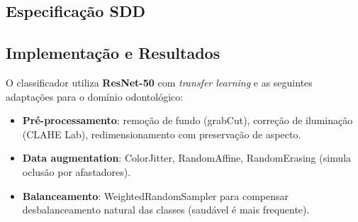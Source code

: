   

\subsection{Especificação SDD}


\subsection{Implementação e Resultados}

O classificador utiliza \textbf{ResNet-50} com \textit{transfer learning}
e as seguintes adaptações para o domínio odontológico:

\begin{itemize}
  \item \textbf{Pré-processamento}: remoção de fundo (grabCut), correção
    de iluminação (CLAHE Lab), redimensionamento com preservação de
    aspecto.
  \item \textbf{Data augmentation}: ColorJitter, RandomAffine, RandomErasing
    (simula oclusão por afastadores).
  \item \textbf{Balanceamento}: WeightedRandomSampler para compensar
    desbalanceamento natural das classes (saudável é mais frequente).
\end{itemize}

